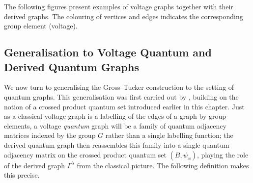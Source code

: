 The following figures present examples of voltage graphs together
with their derived graphs. The colouring of vertices and edges
indicates the corresponding group element (voltage).



\subsection{Generalisation to Voltage Quantum and Derived Quantum Graphs}
\label{subsec:quantum-voltage-and-derived-graphs}

We now turn to generalising the Gross--Tucker construction to the
setting of quantum graphs. This generalisation was first carried out
by \textcite{tobolski26}, building on the notion
of a crossed product quantum set introduced earlier in this chapter.
Just as a classical voltage graph is a labelling of the edges of a
graph by group elements, a voltage \emph{quantum} graph will be a
family of quantum adjacency matrices indexed by the group \( G \)
rather than a single labelling function; the derived quantum graph
then reassembles this family into a single quantum adjacency matrix on
the crossed product quantum set \( (B, \psi_\rtimes) \), playing the
role of the derived graph \( \Gamma^\lambda \) from the classical
picture. The following definition makes this precise.

